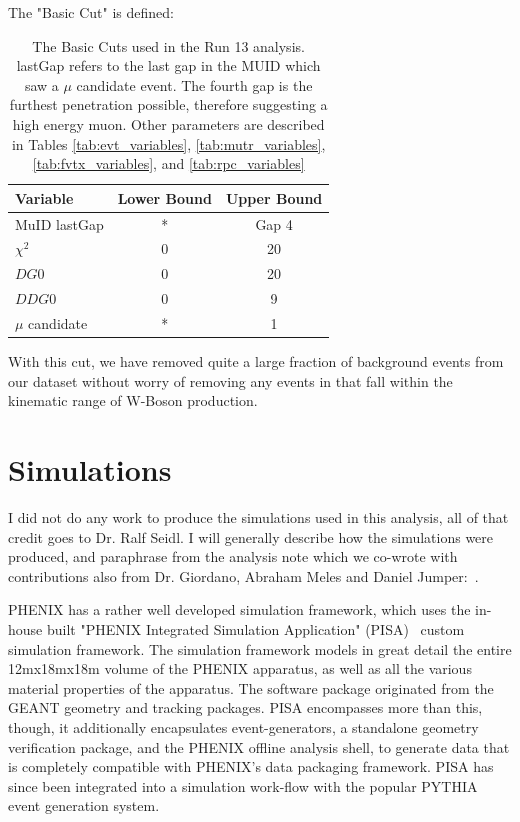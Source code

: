 The "Basic Cut" is defined:
\begin{table}[ht]
  \centering
  \begin{tabular}{l c c}
    \toprule
    \textbf{Variable} & \textbf{Lower Bound} & \textbf{Upper Bound} \\
    \midrule
    MuID lastGap & * & Gap 4 \\ 
    $\chi^2$ & 0 & 20 \\
    $DG0$ & 0 & 20 \\
    $DDG0$ & 0 & 9 \\
    $\mu$ candidate & * & 1 \\
    \bottomrule
  \end{tabular}
  \caption{ The Basic Cuts used in the Run 13 analysis. lastGap refers to the
    last gap in the MUID which saw a $\mu$ candidate event. The fourth gap is
    the furthest penetration possible, therefore suggesting a high energy muon.
    Other parameters are described in Tables \ref{tab:evt_variables}, 
    \ref{tab:mutr_variables}, \ref{tab:fvtx_variables}, and
    \ref{tab:rpc_variables}
  }
  \label{tab:basic_cut}
\end{table}

With this cut, we have removed quite a large fraction of background events from
our dataset without worry of removing any events in that fall within the
kinematic range of W-Boson production.

\clearpage
\section{Simulations}

I did not do any work to produce the simulations used in this analysis, all of
that credit goes to Dr. Ralf Seidl. I will generally describe how the
simulations were produced, and paraphrase from the analysis note which we
co-wrote with contributions also from Dr. Giordano, Abraham Meles and Daniel
Jumper:~\cite{Seidl2014a}.

PHENIX has a rather well developed simulation framework, which uses the in-house
built "PHENIX Integrated Simulation Application" (PISA)~\cite{Macguire1997}
custom simulation framework. The simulation framework models in great detail the
entire 12mx18mx18m volume of the PHENIX apparatus, as well as all the various
material properties of the apparatus. The software package originated from the
GEANT geometry and tracking packages. PISA encompasses more than this, though,
it additionally encapsulates event-generators, a standalone geometry
verification package, and the PHENIX offline analysis shell, to generate data
that is completely compatible with PHENIX's data packaging framework. PISA has
since been integrated into a simulation work-flow with the popular PYTHIA event
generation system.

